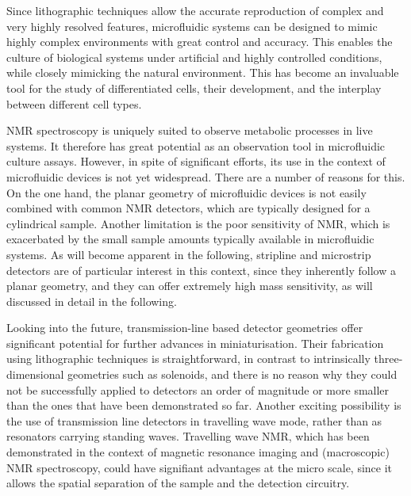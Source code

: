 Since lithographic techniques allow the accurate reproduction of complex and very highly resolved 
features, microfluidic systems can be designed to mimic highly complex environments with great control 
and accuracy. This enables the culture of biological systems under artificial and highly controlled 
conditions, while closely mimicking the natural environment. This has become an invaluable tool for the 
study of  differentiated cells, their development, and the interplay between different cell types. 

NMR spectroscopy is uniquely suited to observe metabolic processes in live systems. It therefore has 
great potential as an observation tool in microfluidic culture assays. However, in spite of significant 
efforts, its use in the context of microfluidic devices is not yet widespread. There are a number of 
reasons for this. On the one hand, the planar geometry of microfluidic devices is not easily combined 
with common NMR detectors, which are typically designed for a cylindrical sample. Another limitation is 
the poor sensitivity of NMR, which is exacerbated by the small sample amounts typically available in 
microfluidic systems. As will become apparent in the following, stripline and microstrip detectors are of 
particular interest in this context, since they inherently follow a planar geometry, and they can offer 
extremely high mass sensitivity, as will discussed in detail in the following.

Looking into the future, transmission-line based detector geometries offer significant potential for further 
advances in miniaturisation. Their fabrication using lithographic techniques is straightforward, in 
contrast to intrinsically three-dimensional geometries such as solenoids, and there is no reason why 
they could not be successfully applied to detectors an order of magnitude or more smaller than the ones 
that have been demonstrated so far. Another exciting possibility is the use of transmission line detectors in 
travelling wave mode, rather than as resonators carrying standing waves. Travelling wave NMR, which 
has been demonstrated in the context of magnetic resonance imaging and (macroscopic) NMR spectroscopy, 
could have signifiant advantages at the micro scale, since it allows the spatial separation of the 
sample and the detection circuitry. 
